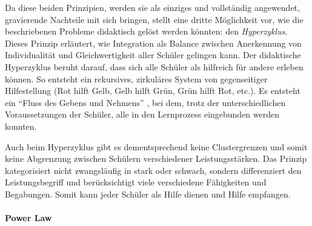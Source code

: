Da diese beiden Prinzipien, werden sie als einziges und vollständig angewendet, gravierende Nachteile mit sich bringen, stellt \citeauthor{Zimpel2012} eine dritte Möglichkeit vor, wie die beschriebenen Probleme didaktisch gelöst werden könnten: den \emph{Hyperzyklus}.
Dieses Prinzip erläutert, wie Integration als Balance zwischen Anerkennung von Individualität und Gleichwertigkeit aller Schüler gelingen kann.
Der didaktische Hyperzyklus beruht darauf, dass sich alle Schüler als hilfreich für andere erleben können.
So entsteht ein rekursives, zirkuläres System von gegenseitiger Hilfestellung (Rot hilft Gelb, Gelb hilft Grün, Grün hilft Rot, etc.).
Es entsteht ein ``Fluss des Gebens und Nehmens'' \parencite[125]{Zimpel2012}, bei dem, trotz der unterschiedlichen Voraussetzungen der Schüler, alle in den Lernprozess eingebunden werden konnten.

Auch beim Hyperzyklus gibt es dementsprechend keine Clustergrenzen und somit keine Abgrenzung zwischen Schülern verschiedener Leistungsstärken.
Das Prinzip kategorisiert nicht zwangsläufig in stark oder schwach, sondern differenziert den Leistungsbegriff und berücksichtigt viele verschiedene Fähigkeiten und Begabungen.
Somit kann jeder Schüler als Hilfe dienen und Hilfe empfangen.


\paragraph{Power Law}


